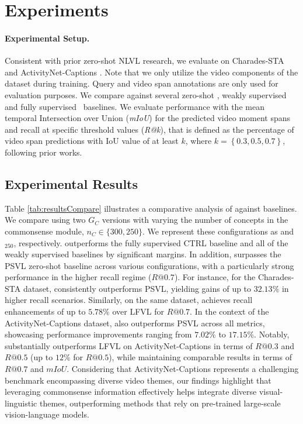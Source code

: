 
\section{Experiments}

\paragraph{Experimental Setup.}
Consistent with prior zero-shot NLVL research, we evaluate on Charades-STA \cite{Gao_2017_ICCV} and ActivityNet-Captions \cite{heilbron2015activitynet,krishna2017dense}. Note that we only utilize the video components of the dataset during training. Query and video span annotations are only used for evaluation purposes. We compare \modelname against several zero-shot \cite{nam_zero-shot_2021,kim2023language}, weakly supervised \cite{mithun_weakly_2019,chen_look_2020,lin_weakly-supervised_2020,duan2018weakly,gao2019wslln} and fully supervised~\cite{Gao_2017_ICCV,mun_local-global_2020} baselines. We evaluate performance with the mean temporal Intersection over Union (\textit{mIoU}) for the predicted video moment spans and recall at specific threshold values (\textit{R@k}), that is defined as the percentage of video span predictions with IoU value of at least \(k\), where \(k= \left\{ 0.3,0.5,0.7\right\} \), following prior works. 

\subsection{Experimental Results}
Table \ref{tab:resultsCompare} illustrates a comparative analysis of \modelname against baselines. We compare \modelname using two  \(G_{C}\) versions with varying the number of concepts in the commonsense module, \ie \(n_C \in \{300, 250\}\). We represent these configurations as \modelname and \modelname$_{250}$, respectively. 
\modelname outperforms the fully supervised CTRL baseline and all of the weakly supervised baselines by significant margins. In addition, \modelname surpasses the PSVL zero-shot baseline across various configurations, with a particularly strong performance in the higher recall regime (\(R@0.7\)).
For instance, for the Charades-STA dataset, \modelname consistently outperforms PSVL, yielding gains of up to $32.13\%$ in higher recall scenarios. Similarly, on the same dataset, \modelname achieves recall enhancements of up to $5.78\%$ over LFVL for \(R@0.7\). In the context of the ActivityNet-Captions dataset, \modelname also outperforms PSVL across all metrics, showcasing performance improvements ranging from $7.02\%$ to $17.15\%$.
Notably, \modelname substantially outperforms LFVL on ActivityNet-Captions in terms of \(R@0.3\) and \(R@0.5\) (up to $12\%$ for \(R@0.5\)), while maintaining comparable results in terms of \(R@0.7\) and \(mIoU\). Considering that ActivityNet-Captions represents a challenging benchmark encompassing diverse video themes, our findings highlight that leveraging commonsense information effectively helps integrate diverse visual-linguistic themes, outperforming methods that rely on pre-trained large-scale vision-language models.

